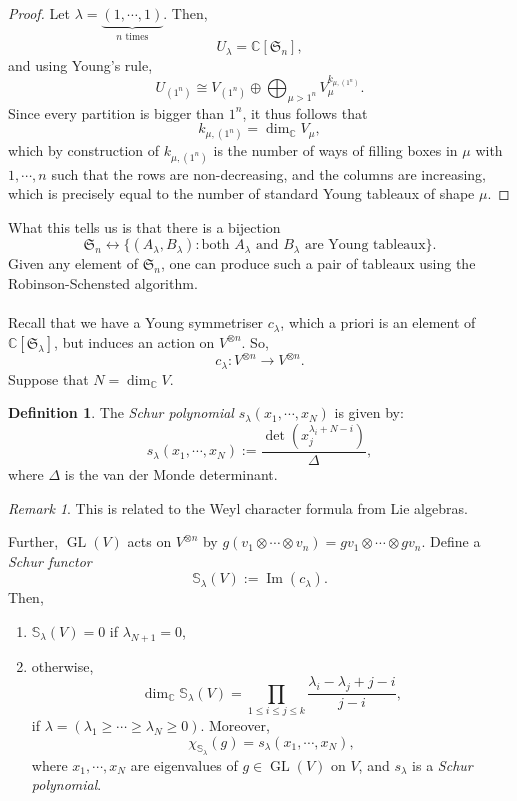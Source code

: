 \documentclass[a4paper]{report}
\theoremstyle{definition}
\newtheorem{definition}{Definition}
\theoremstyle{remark}
\newtheorem{remark}{Remark}
\theoremstyle{proposition}
\theoremstyle{conjecture}
\theoremstyle{lemma}
\theoremstyle{corollary}
\theoremstyle{exercise}
\theoremstyle{example}
\newcommand{\C}{\mathbb{C}}
\newcommand{\on}{\operatorname}
\begin{document}
\begin{proof}
    Let $\lambda = \underbrace{(1,\cdots,1)}_{\text{$n$ times}}$. 
    Then,
    $$U_\lambda = \C[\mathfrak{S}_n],$$
    and using Young's rule,
    $$U_{(1^n)} \cong V_{(1^n)} \oplus \bigoplus_{\mu > 1^n} V_\mu^{k_{\mu,(1^n)}}.$$
    Since every partition is bigger than $1^n$, it thus follows that 
    $$k_{\mu,(1^n)} = \dim_\C V_\mu,$$
    which by construction of $k_{\mu,(1^n)}$ is the number of ways of filling 
    boxes in $\mu$ with $1,\cdots,n$ such that the rows are non-decreasing,
    and the columns are increasing, which is precisely equal to the number of 
    standard Young tableaux of shape $\mu$.

\end{proof}

What this tells us is that there is a bijection
$$\mathfrak{S}_n \longleftrightarrow \lbrace (A_\lambda,B_\lambda) : \text{both 
$A_\lambda$ and $B_\lambda$ are Young tableaux}\rbrace.$$
Given any element of $\mathfrak{S}_n$, one can produce such a pair of 
tableaux using the Robinson-Schensted algorithm.\\\\
Recall that we have a Young symmetriser $c_\lambda$, which a priori is an 
element of $\C[\mathfrak{S}_\lambda]$, but induces an action on $V^{\otimes n}$.
So,
$$c_\lambda : V^{\otimes n}\longrightarrow V^{\otimes n}.$$
Suppose that $N = \dim_\C V$.
\begin{definition}
    The \emph{Schur polynomial} $s_\lambda(x_1,\cdots,x_N)$
    is given by:
    $$s_\lambda(x_1,\cdots,x_N) := \frac{\det \left(x_j^{\lambda_i + N - i}\right)}{\Delta},$$
    where $\Delta$ is the van der Monde determinant.
\end{definition}
\begin{remark}
    This is related to the Weyl character formula from 
    Lie algebras.
\end{remark}
Further, 
$\on{GL}(V)$ acts on $V^{\otimes n}$ by 
$g(v_1\otimes\cdots\otimes v_n) = gv_1\otimes\cdots\otimes gv_n$.
Define a \emph{Schur functor}
$$\mathbb{S}_\lambda(V) := \on{Im}(c_\lambda).$$
Then,
\begin{enumerate}
    \item $\mathbb{S}_\lambda(V) = 0$ if $\lambda_{N+1} = 0$,
    \item otherwise, $$\dim_\C \mathbb{S}_\lambda(V) = \prod_{1\leq i \leq j \leq k}\frac{\lambda_i-\lambda_j + j - i}{j-i},$$ if $\lambda = (\lambda_1\geq \cdots\geq \lambda_N \geq 0)$. Moreover, 
        $$\chi_{\mathbb{S}_\lambda}(g) = s_\lambda(x_1,\cdots,x_N),$$
        where $x_1,\cdots,x_N$ are eigenvalues of $g\in\on{GL}(V)$
        on $V$, and $s_\lambda$ is a \emph{Schur polynomial}.
\end{enumerate}
\end{document}

